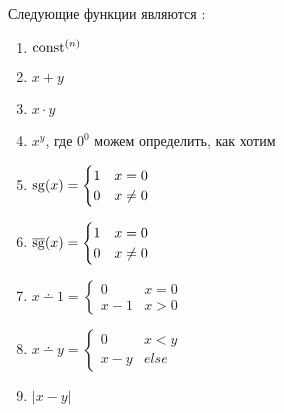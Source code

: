 \begin{lm}\label{lm:rec}
    Следующие функции являются \prf:
	\begin{enumerate}
	\item $ \textmd{const} ^{(n)}$ 
	\item $ x + y$ 
	\item $ x\cdot y$ 
	\item $ x ^{y}$, где $ 0^{0}$ можем определить, как хотим
	\item $ \operatorname{sg}(x) = \begin{cases}
			1 & x= 0 \\
			0 & x\ne 0
		\end{cases}$
	\item $ \operatorname{\overline{sg}}(x) = \begin{cases}
			1 & x= 0 \\
			0 & x\ne 0
		\end{cases}$
	\item $ x \dotminus 1 = \begin{cases}
			0 & x = 0 \\
			x - 1 & x > 0
		\end{cases}$ 
	\item $ x \dotminus y = \begin{cases}
			0 & x < y \\
			x - y & else
		\end{cases}$ 
	\item $ \lvert x - y \rvert $
	\end{enumerate}
\end{lm}

